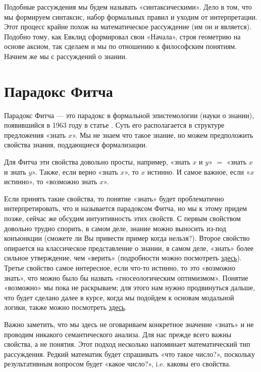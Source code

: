 \documentclass[openany]{book}
\theoremstyle{plain}
\theoremstyle{definition}
\begin{document}
Подобные рассуждения мы будем называть «синтаксическими». Дело в том, что мы формируем синтаксис, набор формальных правил и уходим от интерпретации. Этот процесс крайне похож на математическое рассуждение (им он и является). Подобно тому, как Евклид сформировал свои «Начала», строя геометрию на основе аксиом, так сделаем и мы по отношению к философским понятиям. Начнем же мы с рассуждений о знании.

\section{Парадокс Фитча}

Парадокс Фитча — это парадокс в формальной эпистемологии (науки о знании), появившийся в 1963 году в статье \cite{Fitch}. Суть его располагается в структуре предложения «знать \(x\)». Мы не знаем что такое знание, но можем предположить свойства знания, поддающиеся формализации.

Для Фитча эти свойства довольно просты, например, «знать \(x\) и \(y\)» \(=\) «знать \(x\) и знать \(y\)». Также, если верно «знать \(x\)», то \(x\) истинно. И самое важное, если «\(x\) истинно», то «возможно знать \(x\)».

Если принять такие свойства, то понятие «знать» будет проблематично интерпретировать, что и называется парадоксом Фитча, но мы к этому придем позже, сейчас же обсудим интуитивность этих свойств. С первым свойством довольно трудно спорить, в самом деле, знание можно выносить из-под конъюнкции (сможете ли Вы привести пример когда нельзя?). Второе свойство опирается на классическое представление о знании, в самом деле, «знать» более сильное утверждение, чем «верить» (подробности можно посмотреть \href{https://plato.stanford.edu/entries/knowledge-analysis/}{здесь}). Третье свойство самое интересное, если что-то истинно, то это «возможно знать», что можно было бы назвать «гносеологическим оптимизмом». Понятие «возможно» мы пока не раскрываем; для этого нам нужно продвинуться дальше, что будет сделано далее в курсе, когда мы подойдем к основам модальной логики, также можно посмотреть \href{https://plato.stanford.edu/entries/logic-modal}{здесь}.

Важно заметить, что мы здесь не оговариваем конкретное значение «знать» и не проводим никакого семантического анализа. Для нас прежде всего важны свойства, а не понятия. Этот подход несколько напоминает математический тип рассуждения. Редкий математик будет спрашивать «что такое число?», поскольку результативным вопросом будет «какое число?», i.e. каковы его свойства.
\end{document}
